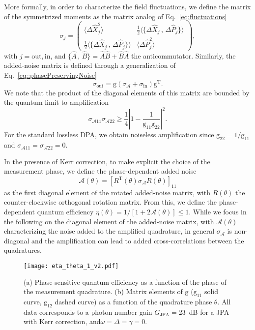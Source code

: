 \documentclass[pra,twocolumn,superscriptaddress]{revtex4-1}
\newcommand{\parS}[1]{\left[#1\right]}
\newcommand{\parO}[1]{\left(#1\right)}
\newcommand{\matO}[1]{\parO{\begin{matrix}#1\end{matrix}}}
\newcommand{\abs}[1]{\left|#1\right|}
\newcommand{\Grm}[0]{\mathrm{g}}
\newcommand{\Am}[0]{\mathcal{A}}
\begin{document}
More formally, in order to characterize the field fluctuations, 
we define the matrix of the symmetrized moments as the matrix analog of Eq.~\eqref{eq:fluctuations}~\cite{caves:1982a}
\begin{equation}
	\sigma_j = \matO{
	\langle\Delta \hat X_{j}^2 \rangle
	& \frac{1}{2} \langle\{\Delta \hat X_{j} \,\mathrm{,}\, \Delta \hat P_{j} \}\rangle
	\\
	\frac{1}{2} \langle \{\Delta \hat X_{j} \,\mathrm{,}\, \Delta \hat P_{j} \}\rangle
	 & 
	 \langle\Delta \hat P_{j}^2 \rangle 
	},
\end{equation}
with $j= \mathrm{out,in}$, and $\{ \hat A \,\mathrm{,}\, \hat B \} = \hat A \hat B+\hat B \hat A$ the anticommutator.
Similarly, the added-noise matrix is defined through a generalization of Eq.~\eqref{eq::phasePreservingNoise} 
\begin{equation}
	\sigma_{\mathrm{out}} =  \Grm \parO{ \sigma_{\Am} +  \sigma_{\mathrm{in}}} \Grm^\mathrm{T}.
\end{equation}
We note that the product of the diagonal elements of this matrix are bounded by the quantum limit to amplification~\cite{caves:1982a}  
\begin{equation}
	\sigma_{\Am11} \sigma_{\Am22} \geq  \frac{1}{4}\abs{1 - \frac{1}{\Grm_{11}\Grm_{22}}}^2.
\end{equation}
For the standard lossless DPA, we obtain noiseless amplification since $\Grm_{22} = 1/\Grm_{11}$ and $\sigma_{\Am11} = \sigma_{\Am22} = 0$.

In the presence of Kerr correction, to make explicit the choice of the measurement phase, we define the phase-dependent added noise
\begin{equation}
	\Am(\theta) = \parS{R^{\mathrm{T}}(\theta) \sigma_\Am R(\theta)}_{11}
	\label{eq:ATheta}
\end{equation}
as the first diagonal element of the rotated added-noise matrix, with $R(\theta)$ the counter-clockwise
orthogonal rotation matrix.
% 
From this, we define the phase-dependent quantum efficiency
	$\eta(\theta) = 1/[1+2 \Am(\theta)] \leq 1$.
While we focus in the following on the diagonal element of the added-noise matrix, with $\Am(\theta)$ characterizing the noise added to the amplified quadrature, in general $\sigma_\Am$ is non-diagonal and the amplification can lead to added cross-correlations between the quadratures.

\begin{figure}[tb]
	\texttt{[image: eta\_theta\_1\_v2.pdf]}
	\caption{
	(a) Phase-sensitive quantum efficiency as a function of the phase of the measurement quadrature. 
	(b) Matrix elements of $\Grm$ ($\Grm_{11}$ solid curve, $\Grm_{12}$ dashed curve) as a function of the quadrature phase $\theta$. 
	All data corresponds to a photon number gain $G_{\mathrm{JPA}} = 23$~dB for a JPA with Kerr correction, and$\omega=\Delta =\gamma=0$.
	}
	\label{fig:etaTheta}
\end{figure}
\end{document}
